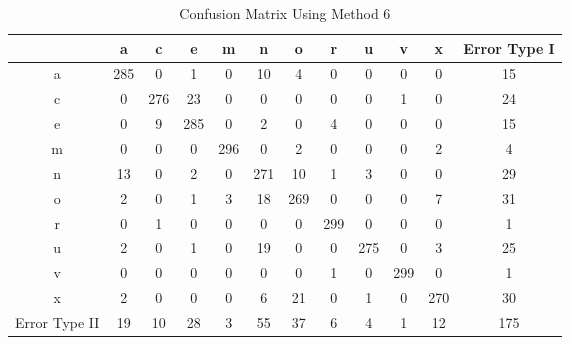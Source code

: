 \documentclass[12pt]{article}
\begin{document}
\begin{table*}
    \centering
    \caption{Confusion Matrix Using Method 6}
    \begin{tabular}{| c | c | c | c | c | c | c | c | c | c | c | c |} \hline
        & a & c & e & m & n & o & r & u & v & x & Error Type I\\ \hline
      a & 285 & 0 & 1 & 0 & 10 & 4 & 0 & 0 & 0 & 0 & 15\\ \hline
      c & 0 & 276 & 23 & 0 & 0 & 0 & 0 & 0 & 1 & 0 & 24\\ \hline
      e & 0 & 9 & 285 & 0 & 2 & 0 & 4 & 0 & 0 & 0 & 15\\ \hline
      m & 0 & 0 & 0 & 296 & 0 & 2 & 0 & 0 & 0 & 2 & 4\\ \hline
      n & 13 & 0 & 2 & 0 & 271 & 10 & 1 & 3 & 0 & 0 & 29\\ \hline
      o & 2 & 0 & 1 & 3 & 18 & 269 & 0 & 0 & 0 & 7 & 31\\ \hline
      r & 0 & 1 & 0 & 0 & 0 & 0 & 299 & 0 & 0 & 0 & 1\\ \hline
      u & 2 & 0 & 1 & 0 & 19 & 0 & 0 & 275 & 0 & 3 & 25\\ \hline
      v & 0 & 0 & 0 & 0 & 0 & 0 & 1 & 0 & 299 & 0 & 1\\ \hline
      x & 2 & 0 & 0 & 0 & 6 & 21 & 0 & 1 & 0 & 270 & 30\\ \hline
Error Type II & 19 & 10 & 28 & 3 & 55 & 37 & 6 & 4 & 1 & 12 & 175\\ \hline
    \end{tabular}
\end{table*}
\end{document}
